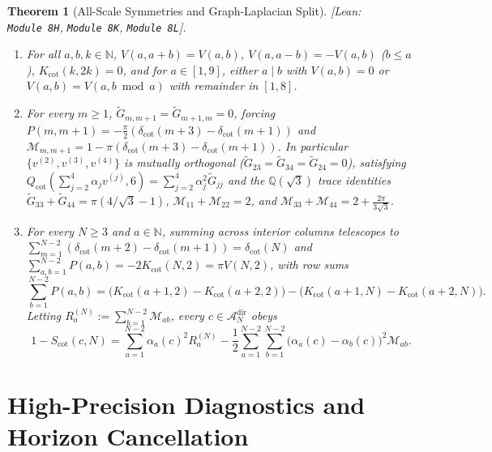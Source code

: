 \documentclass[11pt,a4paper]{article}
\newtheorem{theorem}{Theorem}[section]
\theoremstyle{definition}
\newcommand{\N}{\mathbb{N}}
\newcommand{\Q}{\mathbb{Q}}
\begin{document}
\begin{theorem}[All-Scale Symmetries and Graph-Laplacian Split]\label{thm:log_decay_bridge}
\emph{[Lean: \texttt{Module~8H}, \texttt{Module~8K}, \texttt{Module~8L}].}
\begin{enumerate}[leftmargin=1.8em,itemsep=2pt]
\item For all $a, b, k \in \N$, $V(a, a+b) = V(a, b)$, $V(a, a-b) = -V(a,b)$ ($b \le a$), $K_{\mathrm{cot}}(k, 2k) = 0$, and for $a \in [1,9]$, either $a \mid b$ with $V(a,b)=0$ or $V(a,b) = V(a, b \bmod a)$ with remainder in $[1,8]$.
\item For every $m \ge 1$, $\widetilde{G}_{m,m+1} = \widetilde{G}_{m+1,m} = 0$, forcing $P(m,m+1) = -\tfrac{\pi}{2}(\delta_{\mathrm{cot}}(m+3)-\delta_{\mathrm{cot}}(m+1))$ and $\mathcal{M}_{m,m+1} = 1 - \pi(\delta_{\mathrm{cot}}(m+3)-\delta_{\mathrm{cot}}(m+1))$. In particular $\{v^{(2)},v^{(3)},v^{(4)}\}$ is mutually orthogonal ($\widetilde{G}_{23} = \widetilde{G}_{34} = \widetilde{G}_{24} = 0$), satisfying $Q_{\mathrm{cot}}(\sum_{j=2}^4 \alpha_j v^{(j)}, 6) = \sum_{j=2}^4 \alpha_j^2 \widetilde{G}_{jj}$ and the $\Q(\sqrt{3})$ trace identities $\widetilde{G}_{33}+\widetilde{G}_{44}=\pi(4/\sqrt{3}-1)$, $\mathcal{M}_{11}+\mathcal{M}_{22}=2$, and $\mathcal{M}_{33}+\mathcal{M}_{44}=2+\tfrac{2\pi}{3\sqrt{3}}$.
\item For every $N \ge 3$ and $a \in \N$, summing across interior columns telescopes to $\sum_{m=1}^{N-2}(\delta_{\mathrm{cot}}(m+2)-\delta_{\mathrm{cot}}(m+1)) = \delta_{\mathrm{cot}}(N)$ and $\sum_{a,b=1}^{N-2} P(a,b) = -2 K_{\mathrm{cot}}(N,2) = \pi V(N,2)$, with row sums
\[
\sum_{b=1}^{N-2} P(a,b) = \bigl(K_{\mathrm{cot}}(a+1,2)-K_{\mathrm{cot}}(a+2,2)\bigr)-\bigl(K_{\mathrm{cot}}(a+1,N)-K_{\mathrm{cot}}(a+2,N)\bigr).
\]
Letting $R_a^{(N)} := \sum_{b=1}^{N-2}\mathcal{M}_{ab}$, every $c \in \mathcal{A}_N^{\mathrm{dir}}$ obeys
\begin{equation}\label{eq:graph_laplacian_l}
1 - S_{\mathrm{cot}}(c,N) = \sum_{a=1}^{N-2}\alpha_a(c)^2 R_a^{(N)} - \frac{1}{2}\sum_{a=1}^{N-2}\sum_{b=1}^{N-2}\bigl(\alpha_a(c)-\alpha_b(c)\bigr)^2\mathcal{M}_{ab}.
\end{equation}
\end{enumerate}
\end{theorem}

\section{High-Precision Diagnostics and Horizon Cancellation}\label{sec:numerics}
\end{document}
